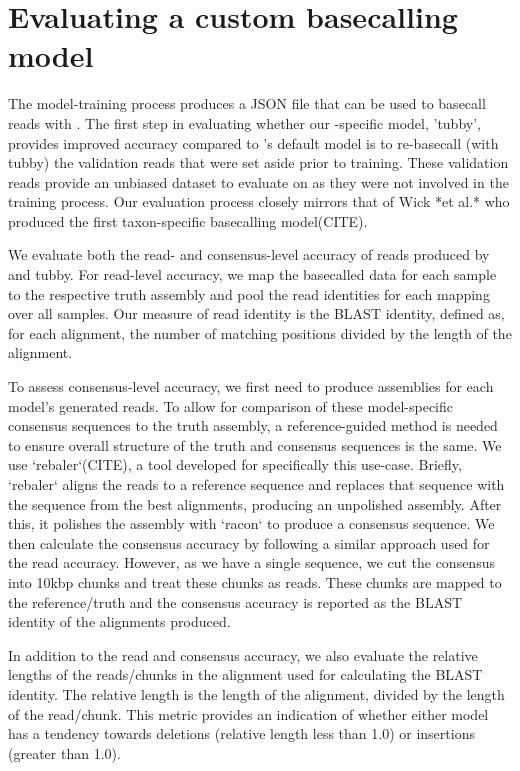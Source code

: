 \section{Evaluating a custom \ont{} basecalling model}

The model-training process produces a JSON file that can be used to basecall \ont{} reads with \guppy{}. The first step in evaluating whether our \mtb{}-specific model, 'tubby', provides improved accuracy compared to \guppy{}'s default model is to re-basecall (with tubby) the validation reads that were set aside prior to training. These validation reads provide an unbiased dataset to evaluate on as they were not involved in the training process. Our evaluation process closely mirrors that of Wick *et al.* who produced the first taxon-specific \ont{} basecalling model(CITE).  

We evaluate both the read- and consensus-level accuracy of reads produced by \guppy{} and tubby. For read-level accuracy, we map the basecalled data for each sample to the respective truth assembly and pool the read identities for each mapping over all samples. Our measure of read identity is the BLAST identity, defined as, for each alignment, the number of matching positions divided by the length of the alignment.  

To assess consensus-level accuracy, we first need to produce assemblies for each model's generated reads. To allow for comparison of these model-specific consensus sequences to the truth assembly, a reference-guided method is needed to ensure overall structure of the truth and consensus sequences is the same. We use `rebaler`(CITE), a tool developed for specifically this use-case. Briefly, `rebaler` aligns the reads to a reference sequence and replaces that sequence with the sequence from the best alignments, producing an unpolished assembly. After this, it polishes the assembly with `racon` to produce a consensus sequence. We then calculate the consensus accuracy by following a similar approach used for the read accuracy. However, as we have a single sequence, we cut the consensus into 10kbp chunks and treat these chunks as reads. These chunks are mapped to the reference/truth and the consensus accuracy is reported as the BLAST identity of the alignments produced.  

In addition to the read and consensus accuracy, we also evaluate the relative lengths of the reads/chunks in the alignment used for calculating the BLAST identity. The relative length is the length of the alignment, divided by the length of the read/chunk. This metric provides an indication of whether either model has a tendency towards deletions (relative length less than 1.0) or insertions (greater than 1.0).  

